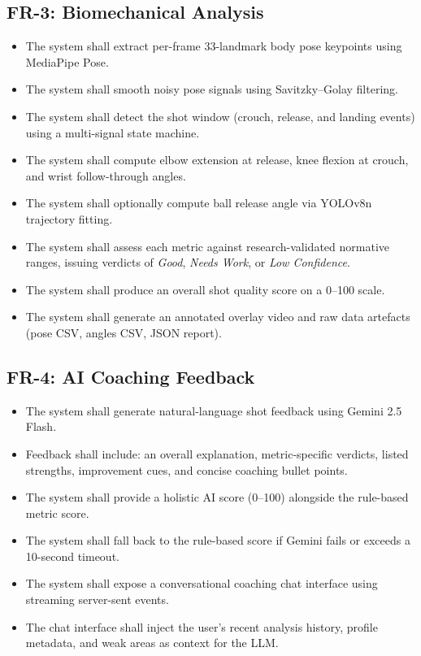 \subsection{FR-3: Biomechanical Analysis}

\begin{itemize}
  \item The system shall extract per-frame 33-landmark body pose keypoints using MediaPipe Pose.
  \item The system shall smooth noisy pose signals using Savitzky--Golay filtering.
  \item The system shall detect the shot window (crouch, release, and landing events) using a multi-signal state machine.
  \item The system shall compute elbow extension at release, knee flexion at crouch, and wrist follow-through angles.
  \item The system shall optionally compute ball release angle via YOLOv8n trajectory fitting.
  \item The system shall assess each metric against research-validated normative ranges, issuing verdicts of \textit{Good}, \textit{Needs Work}, or \textit{Low Confidence}.
  \item The system shall produce an overall shot quality score on a 0--100 scale.
  \item The system shall generate an annotated overlay video and raw data artefacts (pose CSV, angles CSV, JSON report).
\end{itemize}

\subsection{FR-4: AI Coaching Feedback}

\begin{itemize}
  \item The system shall generate natural-language shot feedback using Gemini 2.5 Flash.
  \item Feedback shall include: an overall explanation, metric-specific verdicts, listed strengths, improvement cues, and concise coaching bullet points.
  \item The system shall provide a holistic AI score (0--100) alongside the rule-based metric score.
  \item The system shall fall back to the rule-based score if Gemini fails or exceeds a 10-second timeout.
  \item The system shall expose a conversational coaching chat interface using streaming server-sent events.
  \item The chat interface shall inject the user's recent analysis history, profile metadata, and weak areas as context for the LLM.
\end{itemize}

